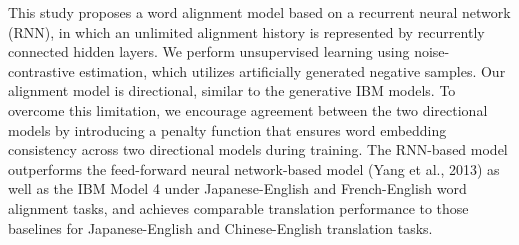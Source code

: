 This study proposes a word alignment model based on a recurrent neural network (RNN), in which an unlimited alignment history is represented by recurrently connected hidden layers. We perform unsupervised learning using noise-contrastive estimation, which utilizes artificially generated negative samples. Our alignment model is directional, similar to the generative IBM models. To overcome this limitation, we encourage agreement between the two directional models by introducing a penalty function that ensures word embedding consistency across two directional models during training. The RNN-based model outperforms the feed-forward neural network-based model (Yang et al., 2013) as well as the IBM Model 4 under Japanese-English and French-English word alignment tasks, and achieves comparable translation performance to those baselines for Japanese-English and Chinese-English translation tasks.
